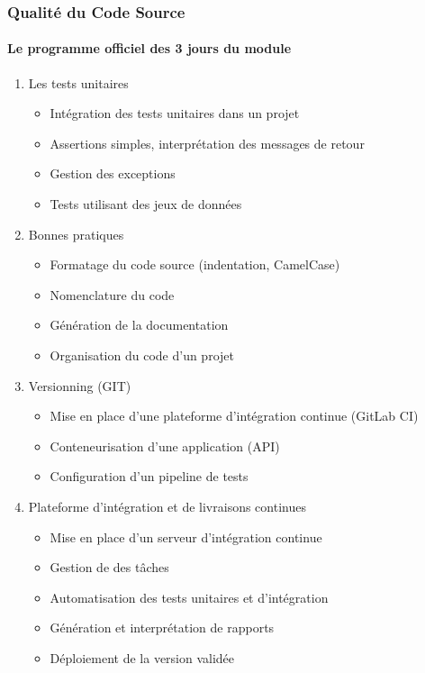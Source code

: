 \documentclass{beamer}
\begin{document}
    \begin{frame}
        \frametitle{Qualité du Code Source}
        \framesubtitle{Le programme officiel des 3 jours du module}
        \transdissolve
        \fontsize{8pt}{8pt}\selectfont
        \begin{enumerate}
            \item Les tests unitaires
            \begin{itemize}
                \fontsize{8pt}{8pt}\selectfont
                \item Intégration des tests unitaires dans un projet
                \item Assertions simples, interprétation des messages de retour
                \item Gestion des exceptions
                \item Tests utilisant des jeux de données
            \end{itemize}
            \item Bonnes pratiques
            \begin{itemize}
                \fontsize{8pt}{8pt}\selectfont
                \item Formatage du code source (indentation, CamelCase)
                \item Nomenclature du code
                \item Génération de la documentation
                \item Organisation du code d’un projet
            \end{itemize}
            \item Versionning (GIT)
            \begin{itemize}
                \fontsize{8pt}{8pt}\selectfont
                \item Mise en place d'une plateforme d'intégration continue (GitLab CI)
                \item Conteneurisation d'une application (API)
                \item Configuration d'un pipeline de tests
            \end{itemize}
            \item Plateforme d’intégration et de livraisons continues
            \begin{itemize}
                \fontsize{8pt}{8pt}\selectfont
                \item Mise en place d’un serveur d’intégration continue
                \item Gestion de des tâches
                \item Automatisation des tests unitaires et d’intégration
                \item Génération et interprétation de rapports
                \item Déploiement de la version validée
            \end{itemize}
        \end{enumerate}
    \end{frame}
\end{document}
